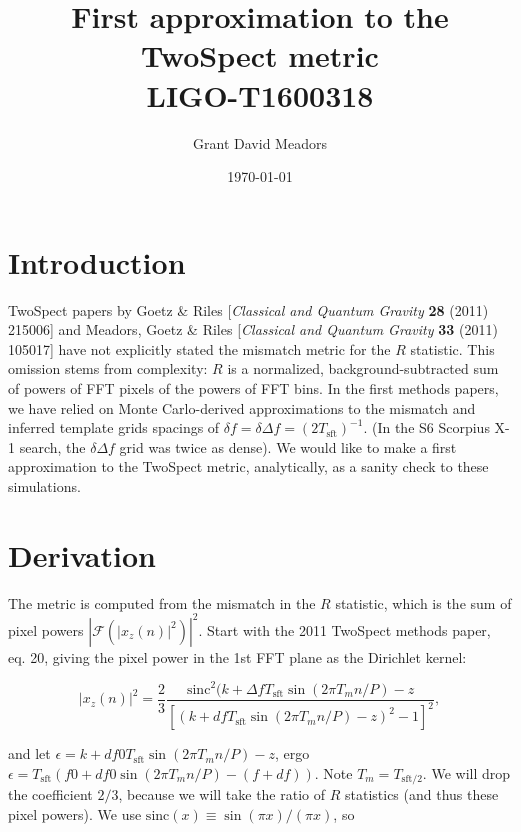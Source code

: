 \documentclass{article}
\begin{document}
\title{First approximation to the TwoSpect metric \\ 
LIGO-T1600318}
\author{Grant David Meadors}
\date{\today}

\maketitle

\section{Introduction}

TwoSpect papers by Goetz \& Riles [\textit{Classical and Quantum Gravity} \textbf{28} (2011) 215006] and Meadors, Goetz \& Riles [\textit{Classical and Quantum Gravity} \textbf{33} (2011) 105017] have not explicitly stated the mismatch metric for the $R$ statistic.
This omission stems from complexity: $R$ is a normalized, background-subtracted sum of powers of FFT pixels of the powers of FFT bins.
In the first methods papers, we have relied on Monte Carlo-derived approximations to the mismatch and inferred template grids spacings of $\delta f = \delta \Delta f = (2 T_\mathrm{sft})^{-1}$.
(In the S6 Scorpius X-1 search, the $\delta \Delta f$ grid was twice as dense).
We would like to make a first approximation to the TwoSpect metric, analytically, as a sanity check to these simulations.


\section{Derivation}

The metric is computed from the mismatch in the $R$ statistic, which is the sum of pixel powers $|\mathcal{F}(|x_z (n)|^2)|^2$.
Start with the 2011 TwoSpect methods paper, eq. 20, giving the pixel power in the 1st FFT plane as the Dirichlet kernel:

\begin{equation}
|x_z (n)|^2 = \frac{2}{3} \frac{\mathrm{sinc}^2 (k+ \Delta f T_\mathrm{sft} \sin (2 \pi T_m n / P)-z}{[(k+df T_\mathrm{sft}
              \sin (2 \pi T_m n / P) -z)^2 -1]^2},
\end{equation}

\noindent and let $\epsilon = k+ df0 T_\mathrm{sft} \sin(2\pi T_m n / P)-z$,
ergo $\epsilon = T_\mathrm{sft}(f0+ df0 \sin(2\pi T_m n /P) - (f+df) )$.
Note $T_m = T_\mathrm{sft/2}$. 
We will drop the coefficient $2/3$, because we will take the ratio of $R$ statistics (and thus these pixel powers).
We use $\mathrm{sinc}(x) \equiv \sin(\pi x)/(\pi x)$,
so
\end{document}
